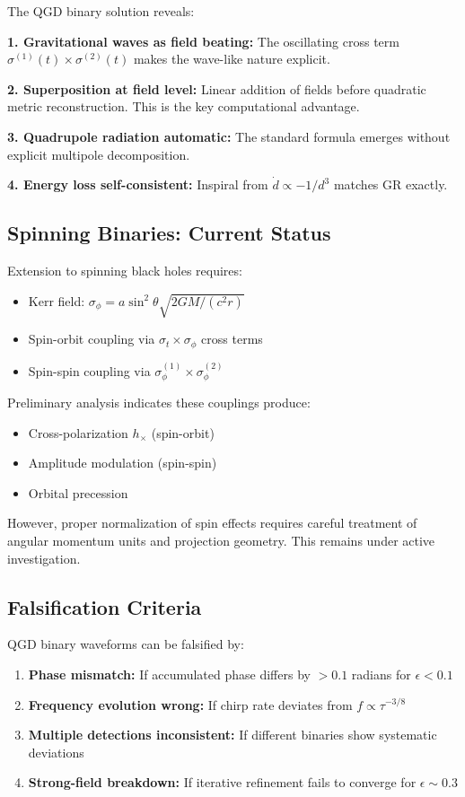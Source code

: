 \documentclass[11pt,a4paper]{article}
\theoremstyle{definition}
\theoremstyle{remark}
\begin{document}
	The QGD binary solution reveals:
	
	\textbf{1. Gravitational waves as field beating:} The oscillating cross term $\sigma^{(1)}(t) \times \sigma^{(2)}(t)$ makes the wave-like nature explicit.
	
	\textbf{2. Superposition at field level:} Linear addition of fields before quadratic metric reconstruction. This is the key computational advantage.
	
	\textbf{3. Quadrupole radiation automatic:} The standard formula emerges without explicit multipole decomposition.
	
	\textbf{4. Energy loss self-consistent:} Inspiral from $\dot{d} \propto -1/d^3$ matches GR exactly.
	
	\subsection{Spinning Binaries: Current Status}
	
	Extension to spinning black holes requires:
	\begin{itemize}
		\item Kerr field: $\sigma_\phi = a\sin^2\theta\sqrt{2GM/(c^2r)}$
		\item Spin-orbit coupling via $\sigma_t \times \sigma_\phi$ cross terms
		\item Spin-spin coupling via $\sigma_\phi^{(1)} \times \sigma_\phi^{(2)}$
	\end{itemize}
	
	Preliminary analysis indicates these couplings produce:
	\begin{itemize}
		\item Cross-polarization $h_\times$ (spin-orbit)
		\item Amplitude modulation (spin-spin)
		\item Orbital precession
	\end{itemize}
	
	However, proper normalization of spin effects requires careful treatment of angular momentum units and projection geometry. This remains under active investigation.
	
	\subsection{Falsification Criteria}
	
	QGD binary waveforms can be falsified by:
	\begin{enumerate}
		\item \textbf{Phase mismatch:} If accumulated phase differs by $> 0.1$ radians for $\epsilon < 0.1$
		\item \textbf{Frequency evolution wrong:} If chirp rate deviates from $f \propto \tau^{-3/8}$
		\item \textbf{Multiple detections inconsistent:} If different binaries show systematic deviations
		\item \textbf{Strong-field breakdown:} If iterative refinement fails to converge for $\epsilon \sim 0.3$
	\end{enumerate}
	
\end{document}
